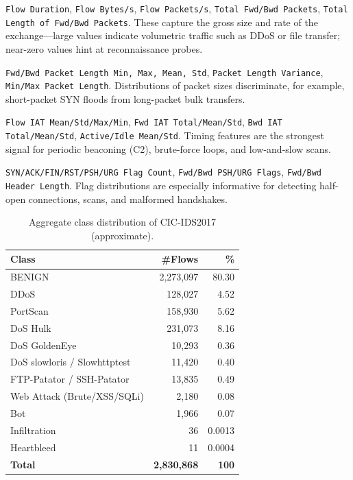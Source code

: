\begin{description}[leftmargin=1.2em,itemsep=2pt,topsep=2pt]
    \item[Flow-level descriptors.] \texttt{Flow Duration}, \texttt{Flow Bytes/s}, \texttt{Flow Packets/s}, \texttt{Total Fwd/Bwd Packets}, \texttt{Total Length of Fwd/Bwd Packets}. These capture the gross size and rate of the exchange---large values indicate volumetric traffic such as DDoS or file transfer; near-zero values hint at reconnaissance probes.
    \item[Packet-size statistics.] \texttt{Fwd/Bwd Packet Length Min, Max, Mean, Std}, \texttt{Packet Length Variance}, \texttt{Min/Max Packet Length}. Distributions of packet sizes discriminate, for example, short-packet SYN floods from long-packet bulk transfers.
    \item[Inter-arrival times (IAT).] \texttt{Flow IAT Mean/Std/Max/Min}, \texttt{Fwd IAT Total/Mean/Std}, \texttt{Bwd IAT Total/Mean/Std}, \texttt{Active/Idle Mean/Std}. Timing features are the strongest signal for periodic beaconing (C2), brute-force loops, and low-and-slow scans.
    \item[TCP flag and header counts.] \texttt{SYN/ACK/FIN/RST/PSH/URG Flag Count}, \texttt{Fwd/Bwd PSH/URG Flags}, \texttt{Fwd/Bwd Header Length}. Flag distributions are especially informative for detecting half-open connections, scans, and malformed handshakes.
\end{description}

\begin{table}[h]
\centering
\caption{Aggregate class distribution of CIC-IDS2017 (approximate).}
\label{tab:class-dist}
\begin{tabular}{lrr}
\toprule
\textbf{Class} & \textbf{\#Flows} & \textbf{\%} \\
\midrule
BENIGN                     & 2,273,097 & 80.30 \\
DDoS                       &   128,027 &  4.52 \\
PortScan                   &   158,930 &  5.62 \\
DoS Hulk                   &   231,073 &  8.16 \\
DoS GoldenEye              &    10,293 &  0.36 \\
DoS slowloris / Slowhttptest &  11,420 &  0.40 \\
FTP-Patator / SSH-Patator   &    13,835 &  0.49 \\
Web Attack (Brute/XSS/SQLi) &     2,180 &  0.08 \\
Bot                         &     1,966 &  0.07 \\
Infiltration                &        36 &  0.0013 \\
Heartbleed                  &        11 &  0.0004 \\
\midrule
\textbf{Total}              & \textbf{2{,}830{,}868} & \textbf{100} \\
\bottomrule
\end{tabular}
\end{table}


